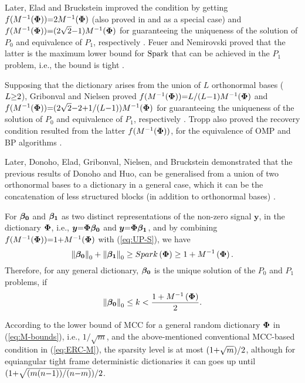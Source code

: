 Later, Elad and Bruckstein improved the condition by getting $f(M^{-1}(\boldsymbol{\Phi})) {=} 2M^{-1}(\boldsymbol{\Phi})$ (also proved in \cite{Donoho2003} and \cite{Donoho2003a} as a special case) and $f(M^{-1}(\boldsymbol{\Phi})) {=} (2\sqrt{2} {-} 1)M^{-1}(\boldsymbol{\Phi})$ for guaranteeing the uniqueness of the solution of $P_0$ and equivalence of $P_1$, respectively \cite{Elad2001}.
Feuer and Nemirovski proved that the latter is the maximum lower bound for $\mathrm{Spark}$ that can be achieved in the $P_1$ problem, i.e., the bound is tight \cite{Feuer2003}.

Supposing that the dictionary arises from the union of $L$ orthonormal bases ($L {\geq} 2$), Gribonval and Nielsen proved $f(M^{-1}(\boldsymbol{\Phi})) {=} L/(L {-} 1)M^{-1}(\boldsymbol{\Phi})$ and $f(M^{-1}(\boldsymbol{\Phi})) {=} (2\sqrt{2} {-} 2 {+} 1/(L {-} 1))M^{-1}(\boldsymbol{\Phi})$ for guaranteeing the uniqueness of the solution of $P_0$ and equivalence of $P_1$, respectively \cite{Gribonval2003a,Gribonval2003}.
Tropp also proved the recovery condition resulted from the latter $f(M^{-1}(\boldsymbol{\Phi}))$, for the equivalence of OMP and BP algorithms \cite{Tropp2004}.

Later, Donoho, Elad, Gribonval, Nielsen, and Bruckstein demonstrated that the previous results of Donoho and Huo,  can be generalised from a union of two orthonormal bases to a dictionary in a general case, which it can be the concatenation of less structured blocks (in addition to orthonormal bases) \cite{Donoho2003,Donoho2003a,Gribonval2003,Bruckstein2009}.

For $\boldsymbol{\beta_0}$ and $\boldsymbol{\beta_1}$ as two distinct representations of the non-zero signal $\boldsymbol{y}$, in the dictionary $\boldsymbol{\Phi}$, i.e., $\boldsymbol{y} {=} \boldsymbol{\Phi} \boldsymbol{\beta_0}$ and $\boldsymbol{y} {=} \boldsymbol{\Phi} \boldsymbol{\beta_1}$, and by combining $f(M^{-1}(\boldsymbol{\Phi})) {=} 1 {+} M^{-1}(\boldsymbol{\Phi})$ with (\ref{eq:UP-S}), we have
\begin{equation}
\label{eq:S-M} 
\left\lVert\boldsymbol{\beta_0}\right\rVert_0 + \left\lVert\boldsymbol{\beta_1}\right\rVert_0 \geq 
Spark \left( \boldsymbol{\Phi} \right) \geq 1+M^{-1}\left( \boldsymbol{\Phi} \right).
\end{equation}
Therefore, for any general dictionary,  $\boldsymbol{\beta_0}$ is the unique solution of the $P_0$ and $P_1$ problems, if
\begin{equation}
\label{eq:ERC-M} 
\left\lVert\boldsymbol{\beta_0}\right\rVert_0 \leq k < \frac{1+M^{-1}\left( \boldsymbol{\Phi} \right)}{2}.
\end{equation}

According to the lower bound of MCC for a general random dictionary $\boldsymbol{\Phi}$ in (\ref{eq:M-bounds}), i.e., $1/\sqrt{m}$, and the above-mentioned conventional MCC-based condition in (\ref{eq:ERC-M}), the sparsity level is at most $(1 {+} \sqrt{m})/2$, although for equiangular tight frame deterministic dictionaries it can goes up until $(1 {+}\sqrt{(m(n {-} 1))/(n {-} m)})/2$.

